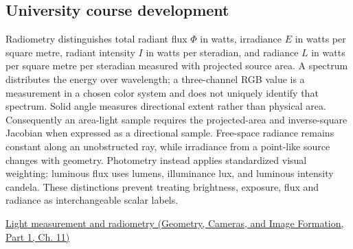\subsection{University course development}\label{appendix-215c2570199b-university-course-development}

\hypertarget{appendix-215c2570199b-university-course-development}{}

Radiometry distinguishes total radiant flux \(\Phi\) in watts, irradiance \(E\) in watts per square metre, radiant intensity \(I\) in watts per steradian, and radiance \(L\) in watts per square metre per steradian measured with projected source area. A spectrum distributes the energy over wavelength; a three-channel RGB value is a measurement in a chosen color system and does not uniquely identify that spectrum. Solid angle measures directional extent rather than physical area. Consequently an area-light sample requires the projected-area and inverse-square Jacobian when expressed as a directional sample. Free-space radiance remains constant along an unobstructed ray, while irradiance from a point-like source changes with geometry. Photometry instead applies standardized visual weighting: luminous flux uses lumens, illuminance lux, and luminous intensity candela. These distinctions prevent treating brightness, exposure, flux and radiance as interchangeable scalar labels.

\href{../03-Geometry-Cameras-and-Image-Formation-P01/main.pdf\#03-visual-computing-i-ch004-light-measurement-and-radiometry}{Light measurement and radiometry (Geometry, Cameras, and Image Formation, Part 1, Ch. 11)}
